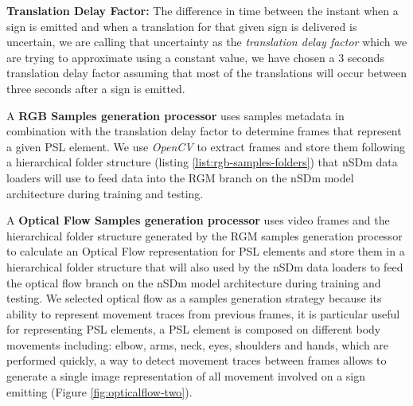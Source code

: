 \documentclass[twocolumn,conference]{article}
\begin{document}
\textbf{Translation Delay Factor: } The difference in time between the instant when a sign is emitted and when a translation for that given sign is delivered is uncertain, we are calling that uncertainty as the \textit{translation delay factor} which we are trying to approximate using a constant value, we have chosen a 3 seconds translation delay factor assuming that most of the translations will occur between three seconds after a sign is emitted.

A \textbf{RGB Samples generation processor} uses samples metadata in combination with the translation delay factor to determine frames that represent a given PSL element. We use \textit{OpenCV} to extract frames and store them following a hierarchical folder structure (listing \ref{list:rgb-samples-folders}) that nSDm data loaders will use to feed data into the RGM branch on the nSDm model architecture during training and testing.

A \textbf{Optical Flow Samples generation processor} uses video frames and the hierarchical folder structure generated by the RGM samples generation processor to calculate an Optical Flow representation for PSL elements and store them in a hierarchical folder structure that will also used by the nSDm data loaders to feed the optical flow branch on the nSDm model architecture during training and testing. We selected optical flow as a samples generation strategy because its ability to represent movement traces from previous frames, it is particular useful for representing PSL elements, a PSL element is composed on different body movements including: elbow, arms, neck, eyes, shoulders and hands, which are performed quickly, a way to detect movement traces between frames allows to generate a single image representation of all movement involved on a sign emitting (Figure \ref{fig:opticalflow-two}). 
\end{document}
